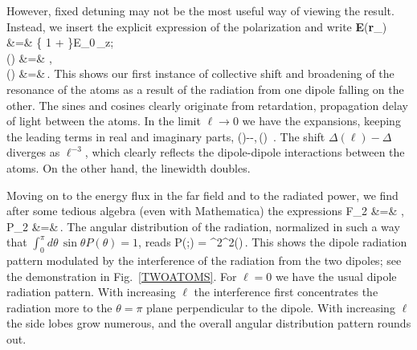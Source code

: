 However, fixed detuning may not be the most useful way of viewing the result. Instead, we insert the explicit expression of the polarization and write
\bea
{\bf E}({\bf r}_\pm) &=& \left\{
1 + 
\right\}E_0\,_z;\\
\Delta(\ell) &=&    \gamma,\nonumber\\
\gamma(\ell) &=&\gamma \,.
\label{GAMMAL}
\eea
This shows our first instance of collective shift and broadening of the resonance of the atoms as a result of the radiation from one dipole falling on the other. The sines and cosines clearly originate from retardation, propagation delay of light between the atoms. In the limit $\ell\rightarrow0$ we have the expansions, keeping the leading terms in real and imaginary parts,
\beq
\Delta(\ell)-\Delta \simeq -,\,\gamma(\ell) \gamma\,.
\eeq
The shift $\Delta(\ell)-\Delta$ diverges as  $\ell^{-3}$, which clearly reflects the dipole-dipole interactions between the atoms. On the other hand, the linewidth doubles.

Moving on to the energy flux in the far field and to the radiated power, we find after some tedious algebra (even with Mathematica) the expressions
\bea
F_2 &=& ,\\
P_2 &=&\,.
\eea
The angular distribution of the radiation, normalized in such a way that $\int_0^\pi d\theta\,\sin\theta P(\theta)=1$, reads
\beq
P(\theta;\ell) = \frac{3\gamma}{2\gamma(\ell)}\cos^2 \sin ^2(\theta )\,.
\eeq
This shows the dipole radiation pattern modulated by the interference of the radiation from the two dipoles; see the demonstration in Fig.~\ref{TWOATOMS}. For $\ell=0$ we have the usual dipole radiation pattern. With increasing $\ell$ the interference first concentrates the radiation more to the $\theta=\pi$ plane perpendicular to the dipole. With increasing $\ell$ the side lobes grow numerous, and the overall angular distribution pattern rounds out.

